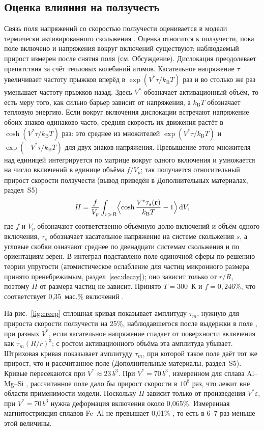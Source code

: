 \documentclass[11pt,a4paper]{article}
\begin{document}
\subsection{Оценка влияния на ползучесть}

Связь поля напряжений со скоростью ползучести оценивается в модели
термически активированного скольжения
\cite{KocksArgonAshby1975,CaillardMartin2003}. Оценка относится
к ползучести, пока поле включено и напряжения вокруг включений существуют;
наблюдаемый прирост измерен после снятия поля (см. Обсуждение). Дислокация преодолевает
препятствия за счёт тепловых колебаний атомов. Касательное напряжение $\tau$
увеличивает частоту прыжков вперёд в $\exp(V^*\tau/k_{\mathrm B}T)$ раз
и во столько же раз уменьшает частоту прыжков назад. Здесь $V^*$
обозначает активационный объём, то есть меру того, как сильно барьер
зависит от напряжения, а $k_{\mathrm B}T$ обозначает тепловую энергию. Если вокруг включения
дислокации встречают напряжение обоих знаков одинаково часто, средняя
скорость их движения растёт в $\cosh(V^*\tau/k_{\mathrm B}T)$ раз: это
среднее из множителей $\exp(V^*\tau/k_{\mathrm B}T)$ и
$\exp(-V^*\tau/k_{\mathrm B}T)$ для двух знаков напряжения. Превышение
этого множителя над единицей интегрируется по матрице вокруг одного
включения и умножается на число включений в единице объёма $f/V_p$;
так получается относительный прирост скорости ползучести (вывод
приведён в Дополнительных материалах, раздел~S5)
\begin{equation}
H=\frac{f}{V_p}\int_{r>R}
\Bigl\langle\cosh\frac{V^*\tau_s(\mathbf r)}{k_{\mathrm B}T}-1\Bigr\rangle
\,\mathrm dV ,
\label{eq:creep}
\end{equation}
где $f$ и $V_p$ обозначают соответственно объёмную долю включений
и объём одного включения, $\tau_s$ обозначает касательное напряжение
на системе скольжения $s$, а
угловые скобки означают среднее по двенадцати системам скольжения
и по ориентациям зёрен. В интеграл подставлено поле одиночной сферы по решению теории
упругости (атомистическое ослабление для частиц микронного размера принято
пренебрежимым, раздел~\ref{sec:decay}); оно зависит только от $r/R$,
поэтому $H$ от размера частиц не зависит. Принято $T=300$~К и $f=0{,}246\%$,
что соответствует 0{,}35~мас.\% включений \cite{Friha2024JMMM}.

На рис.~\ref{fig:creep} сплошная кривая показывает амплитуду $\tau_m$,
нужную для прироста скорости ползучести на 25\%, наблюдавшегося после
выдержки в поле \cite{Skvortsov2019JAP}, при разных
$V^*$, если касательное напряжение спадает от поверхности включения как
$\tau_m(R/r)^3$; с ростом активационного объёма эта амплитуда убывает.
Штриховая кривая показывает амплитуду $\tau_m$, при которой такое поле
даёт тот же прирост, что и рассчитанное поле (Дополнительные материалы,
раздел~S5).
Кривые пересекаются при $V^*\approx23\,b^3$. При $V^*=70\,b^3$,
измеренном для сплава Al--Mg--Si \cite{Soula2022JALCOM}, рассчитанное
поле дало бы прирост скорости в $10^8$ раз, что лежит вне области применимости модели. Поскольку $H$ зависит только от
произведения $V^*\varepsilon$, при $V^*=70\,b^3$ нужна деформация
включения около 0{,}065\%. Измеренная магнитострикция сплавов Fe--Al
не превышает 0{,}01\% \cite{Hall1959,BormioNunes2012}, то есть
в 6--7 раз меньше этой величины.
\end{document}
